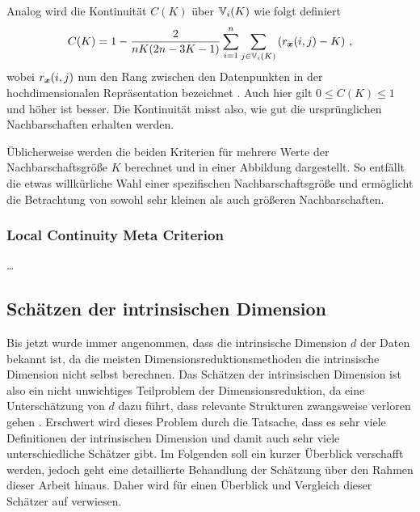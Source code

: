 Analog wird die Kontinuität $C(K)$ über $\mathbb{V}_i(K)$ wie folgt definiert
\begin{equation}
	C(K) = 1 - \frac{2}{nK(2n - 3K - 1)} \sum_{i = 1}^{n}\sum_{j \in \mathbb{V}_i(K) } \left( r_{\bm{x}}(i, j) - K \right) \, ,
\end{equation}
wobei $r_{\bm{x}}(i, j)$ nun den Rang zwischen den Datenpunkten in der hochdimensionalen Repräsentation bezeichnet \parencite[487]{Venna.2001}. Auch hier gilt $0 \leq C(K) \leq 1$ und höher ist besser. Die Kontinuität
misst also, wie gut die ursprünglichen Nachbarschaften erhalten werden.

Üblicherweise werden die beiden Kriterien für mehrere Werte der Nachbarschaftsgröße $K$ berechnet und in einer Abbildung dargestellt. So entfällt die etwas willkürliche Wahl einer spezifischen Nachbarschaftsgröße und ermöglicht die Betrachtung von sowohl sehr kleinen als auch größeren Nachbarschaften.

\subsubsection{Local Continuity Meta Criterion}
\label{ch:Vergleich:sec:Methodik:subsec:Qualitaetskriterien:LCMC}
\ldots
\subsection{Schätzen der intrinsischen Dimension}
\label{ch:Vergleich:sec:Methodik:subsec:SchaetzenDerIntrinsischenDim}

Bis jetzt wurde immer angenommen, dass die intrinsische Dimension $d$ der Daten bekannt ist, da die
meisten Dimensionsreduktionsmethoden die intrinsische Dimension nicht selbst berechnen. Das
Schätzen der intrinsischen Dimension ist also ein nicht unwichtiges Teilproblem der
Dimensionsreduktion, da eine Unterschätzung von $d$ dazu führt, dass relevante Strukturen
zwangsweise verloren gehen \parencite[1]{Levina.2004}. Erschwert wird dieses Problem durch die Tatsache, dass es sehr viele
Definitionen der intrinsischen Dimension und damit auch sehr viele unterschiedliche Schätzer gibt.
Im Folgenden soll ein kurzer Überblick verschafft werden, jedoch geht eine detaillierte Behandlung
der Schätzung über den Rahmen dieser Arbeit hinaus. Daher wird für einen Überblick und Vergleich
dieser Schätzer auf \textcites{Campadelli.2015}{Bac.2021}{Verveer.1995} verwiesen.

